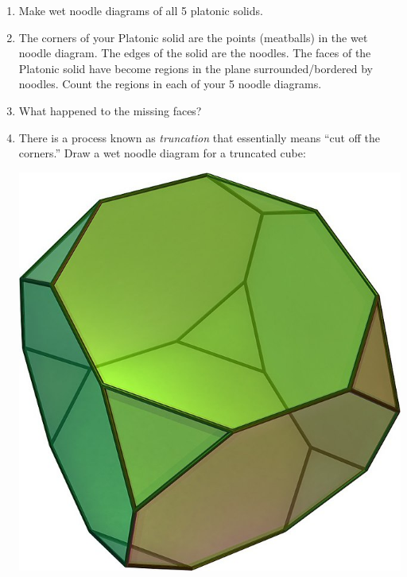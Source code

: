 \begin{enumerate}
    \item Make wet noodle diagrams of all 5 platonic solids.
    
    \wbvfill
    
    \item The corners of your Platonic solid are the points (meatballs) in the wet noodle diagram.  The edges of the solid are the noodles.  The faces of the Platonic solid have become regions in the plane surrounded/bordered by noodles.  Count the regions in each of your 5 noodle diagrams.
    
    \vspace{1in}
    
    \wbnewpage
    
    \item What happened to the missing faces?
    
    \wbvfill
    
    \item There is a process known as {\em truncation} that essentially means ``cut off the corners.''  Draw a wet noodle diagram for a truncated cube:
    
    \centerline{\includegraphics[scale=.25]{images/TruncatedCube.jpeg}}
    

\end{enumerate}
